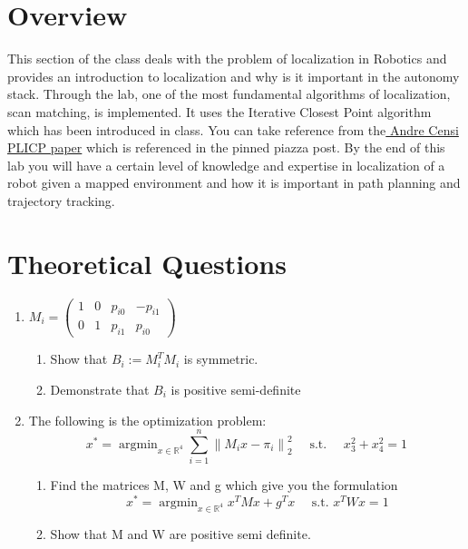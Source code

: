 \documentclass[letta4 paper]{article}
\numberwithin{equation}{section}
\newcommand{\0}{\mathbf{0}}
\begin{document}
	\section{Overview}
	This section of the class deals with the problem of localization in Robotics and provides an introduction to localization and why is it important in the autonomy stack. Through the lab, one of the most fundamental algorithms of localization, scan matching, is implemented. It uses the Iterative Closest Point algorithm which has been introduced in class. You can take reference from the\href{https://censi.science/pub/research/2008-icra-plicp.pdf}{ Andre Censi PLICP paper} which is referenced in the pinned piazza post. By the end of this lab you will have a certain level of knowledge and expertise in localization of a robot given a mapped environment and how it is important in path planning and trajectory tracking. 
	
	 \section{Theoretical Questions}
	 \begin{enumerate}
	 	\item $M_{i}=\left(\begin{array}{cccc}{1} & {0} & {p_{i 0}} & {-p_{i 1}} \\ {0} & {1} & {p_{i 1}} & {p_{i 0}}\end{array}\right)$
 		\begin{enumerate}
 		\item Show that $B_{i} :=M_{i}^{T} M_{i}$ is symmetric. 
 		\item Demonstrate that $B_{i}$ is positive semi-definite
	 	\end{enumerate}{}
 		
 		\item The following is the optimization problem:
 		\[ 
 		x^{*}=\operatorname{argmin}_{x \in \mathbb{R}^{4}} \sum_{i=1}^{n}\left\|M_{i} x-\pi_{i}\right\|_{2}^{2} \quad \text { s.t. } \quad x_{3}^{2}+x_{4}^{2}=1
 		\] 
 		\begin{enumerate}
		\item Find the matrices M, W and g which give you the formulation 
		\[
		 x^{*}=\operatorname{argmin}_{x \in \mathbb{R}^{4}} x^{T} M x+g^{T} x 
		\quad \text { s.t. } x^{T} W x=1
		\]
		\item Show that M and W are positive semi definite.
 		\end{enumerate}{}
	 	
	 \end{enumerate}
\end{document}
